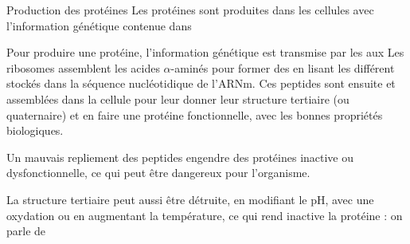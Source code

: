 \newpage\vspace*{-36pt}
\begin{doc}{Production des protéines}
  Les protéines sont produites dans les cellules avec l'information génétique contenue dans 
  
  Pour produire une protéine, l'information génétique est transmise par les  aux 
  Les ribosomes assemblent les acides $\alpha$-aminés pour former des  en lisant les différent  stockés dans la séquence nucléotidique de l'ARNm.
  Ces peptides sont ensuite  et assemblées dans la cellule pour leur donner leur structure tertiaire (ou quaternaire) et en faire une protéine fonctionnelle, avec les bonnes propriétés biologiques.

  Un mauvais repliement des peptides engendre des protéines inactive ou dysfonctionnelle, ce qui peut être dangereux pour l'organisme.

  La structure tertiaire peut aussi être détruite, en modifiant le pH, avec une oxydation ou en augmentant la température, ce qui rend inactive la protéine : on parle de 
\end{doc}

